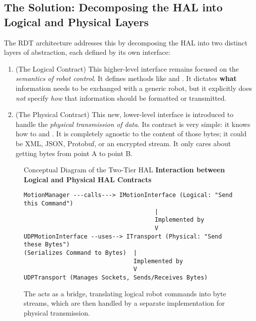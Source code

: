 \subsection{The Solution: Decomposing the HAL into Logical and Physical Layers}
\label{subsec:two_tier_hal_solution_conceptual}

The RDT architecture addresses this by decomposing the HAL into two distinct layers of abstraction, each defined by its own interface:

\begin{enumerate}

    \item {} (The Logical Contract) This higher-level interface remains focused on the \textit{semantics of robot control}. It defines methods like  and . It dictates \textbf{what} information needs to be exchanged with a generic robot, but it explicitly does \textit{not} specify \textit{how} that information should be formatted or transmitted.
    
    \item {} (The Physical Contract) This new, lower-level interface is introduced to handle the \textit{physical transmission of data}. Its contract is very simple: it knows how to  and . It is completely agnostic to the content of those bytes; it could be XML, JSON, Protobuf, or an encrypted stream. It only cares about getting bytes from point A to point B.
\end{enumerate}

\begin{figure}[h!]
    \centering
    \begin{infobox}{Conceptual Diagram of the Two-Tier HAL}
        \textbf{Interaction between Logical and Physical HAL Contracts}
        \begin{verbatim}
MotionManager ---calls---> IMotionInterface (Logical: "Send this Command")
                                     |
                                     Implemented by
                                     V
UDPMotionInterface --uses--> ITransport (Physical: "Send these Bytes")
(Serializes Command to Bytes)  |
                               Implemented by
                               V
UDPTransport (Manages Sockets, Sends/Receives Bytes)
        \end{verbatim}
    \end{infobox}
    \caption{The  acts as a bridge, translating logical robot commands into byte streams, which are then handled by a separate  implementation for physical transmission.}
    \label{fig:two_tier_hal_conceptual}
\end{figure}

